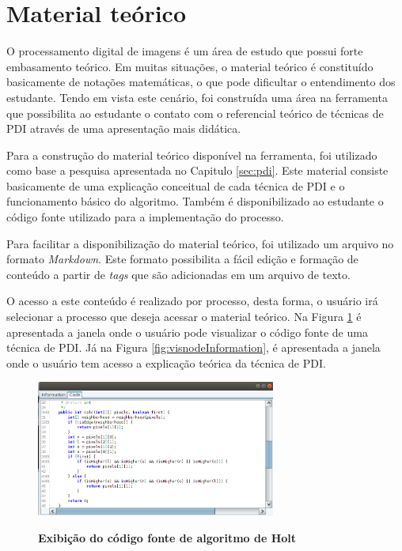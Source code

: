 \documentclass[
	12pt,				%
	oneside,			%
	a4paper,			%
	english,			%
	french,				%
	spanish,			%
	brazil,				%
	]{abntex2}
\begin{document}
\section{Material teórico}

O processamento digital de imagens é um área de estudo que possui forte embasamento teórico. Em muitas situações, o material teórico é constituído basicamente de notações matemáticas, o que pode dificultar o entendimento dos estudante. Tendo em vista este cenário, foi construída uma área na ferramenta que possibilita ao estudante o contato com o referencial teórico de técnicas de PDI através de uma apresentação mais didática.

Para a construção do material teórico disponível na ferramenta, foi utilizado como base a pesquisa apresentada no Capitulo \ref{sec:pdi}. Este material consiste basicamente de uma explicação conceitual de cada técnica de PDI e o funcionamento básico do algoritmo. Também é disponibilizado ao estudante o código fonte utilizado para a implementação do processo.

Para facilitar a disponibilização do material teórico, foi utilizado um arquivo no formato \textit{Markdown}. Este formato possibilita a fácil edição e formação de conteúdo a partir de \textit{tags} que são adicionadas em um arquivo de texto.

O acesso a este conteúdo é realizado por processo, desta forma, o usuário irá selecionar a processo que deseja acessar o material teórico. Na Figura \ref{fig:visnodeCode} é apresentada a janela onde o usuário pode visualizar o código fonte de uma técnica de PDI. Já na Figura \ref{fig:visnodeInformation}, é apresentada a janela onde o usuário tem acesso a explicação teórica da técnica de PDI.

\begin{figure}[ht]
\centering
\caption{\textbf{Exibição do código fonte de algoritmo de Holt}}
\includegraphics[width=0.7\textwidth]{imagens/visnode_code.png}
\sourceAuthor
\label{fig:visnodeCode}
\end{figure}
\end{document}
